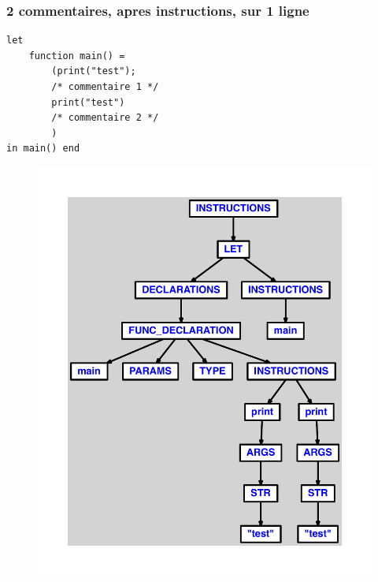 \documentclass{article}
\begin{document}
\subsubsection{2 commentaires, apres instructions, sur 1 ligne}
\begin{lstlisting}
let
	function main() =
		(print("test");
		/* commentaire 1 */
		print("test")
		/* commentaire 2 */
		)
in main() end
\end{lstlisting}
\newpage
\begin{figure}[H]
\centering
\includegraphics[max width=\textwidth]{ast/ast_156.pdf}
\end{figure}
\newpage
\end{document}
